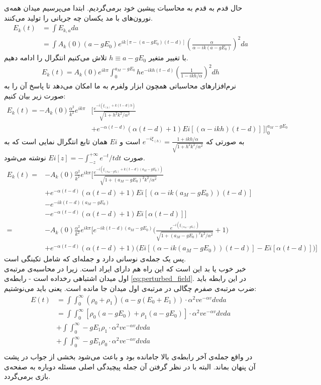 حال قدم به قدم به محاسبات پیشین خود برمی‌گردیم. ابتدا می‌پرسیم میدان همه‌ی نورون‌های با مد یکسان چه جریانی را تولید می‌کنند.
\begin{align}
	E_k(t) &= \int E_{k,a} da\\
	&= \int A_k(0) (a - gE_0) e^{ik[\pi -(a-gE_0)(t-d)]} (\frac{\alpha}{\alpha-ik(a-gE_0)})^2 da
\end{align}
با تغییر متغیر
$h \equiv a - gE_0$
تلاش می‌کنیم انتگرال را ادامه دهیم.
\begin{align}
	E_k(t) = A_k(0)e^{ik\pi} \int^{a_M - gE_0}_{0} h e^{-ikh(t-d)} (\frac{1}{1 - ikh/\alpha})^2 dh
\end{align}
نرم‌افزارهای محاسباتی همچون ابزار ولفرم به ما امکان می‌دهد تا پاسخ آن را به صورت زیر بیان کنیم:
\begin{align}
	E_k(t) = -A_k(0)\frac{\alpha^2}{k^2} e^{ik\pi} &\bigg[ \frac{ e^{-i(\xi_{(h)} + k(t-d)h)} }{\sqrt{1 + h^2 k^2/\alpha^2}} \\
	&+ e^{-\alpha(t-d)}(\alpha(t-d) + 1) Ei[(\alpha-ikh)(t-d)] \, \bigg]	\Biggr|_{0}^{a_M -gE_0}
\end{align}
به صورتی که 
$e^{-i\xi_{(h)}} = \frac{1 + ikh/\alpha}{\sqrt{1 + h^2 k^2/\alpha^2}}$
است و 
$Ei$
همان تابع انتگرال نمایی است که به صورت 
$Ei[z] = - \int^{+\infty}_{-z} e^{-t}/t dt$
نوشته می‌شود.
\begin{align}
	E_k(t) =& - A_k(0) \frac{\alpha^2}{k^2} e^{ik\pi} \bigg[ \frac{ e^{-i(\xi_{(a_M -gE_0)} + k(t-d)(a_M -gE_0))} }{\sqrt{1 + (a_M -gE_0)^2 k^2/\alpha^2}} \\
	&+ e^{-\alpha(t-d)}(\alpha(t-d) + 1) Ei[(\alpha-ik(a_M -gE_0))(t-d)] \\
	&- e^{-ik(t-d)(a_M -gE_0)} \\
	&- e^{-\alpha(t-d)}(\alpha(t-d) + 1) Ei[\alpha(t-d)] \bigg]\\
	=&- A_k(0) \frac{\alpha^2}{k^2} e^{ik\pi} \bigg[ e^{-ik(t-d)(a_M -gE_0)} \bigg( \frac{ e^{-i(\xi_{(a_M -gE_0)})} }{ \sqrt{1 + (a_M -gE_0)^2 k^2/\alpha^2} } + 1\bigg) \\
	&+ e^{-\alpha(t-d)}(\alpha(t-d) + 1)\bigg( Ei[(\alpha-ik(a_M -gE_0))(t-d)] - Ei[\alpha(t-d)] \bigg) \bigg]
\end{align}
پس یک جمله‌ی نوسانی دارد و جمله‌ای که شامل تکینگی است.\\
خبر خوب یا بد این است که این راه هم دارای ایراد است. زیرا در محاسبه‌ی مرتبه‌ی اول میدان اشتباهی رخداده است - رابطه‌ی \ref{eq:perturbed_field}.
در این رابطه باید ضرب مرتبه‌ی صفرم چگالی در مرتبه‌ی اول میدان جا مانده است. یعنی باید می‌نوشتیم:
\begin{align}
		E(t) &= \int \int_{0}^{\infty} (\rho_0 + \rho_1)(a - g(E_0 + E_1) ) \cdot \alpha^2 ve^{-\alpha v} dv da \\
		&= \int \int_{0}^{\infty} [\rho_0(a - gE_0) + \rho_1 (a - gE_0)] \cdot \alpha^2 ve^{-\alpha v} dv da \\
		&+ \int \int_{0}^{\infty} -g E_1 \rho_1 \cdot \alpha^2 ve^{-\alpha v} dv da \\
		&+ \int \int_{0}^{\infty} -g E_1 \rho_0 \cdot \alpha^2 ve^{-\alpha v} dv da \\
\end{align}
در واقع جمله‌ی آخر رابطه‌ی بالا جامانده بود و باعث می‌شود بخشی از جواب در پشت آن پنهان بماند. البته با در نظر گرفتن آن جمله پیچیدگی اصلی مسئله دوباره به صفحه‌ی بازی برمی‌گردد.
 
 
 
 
 
 
 
 


